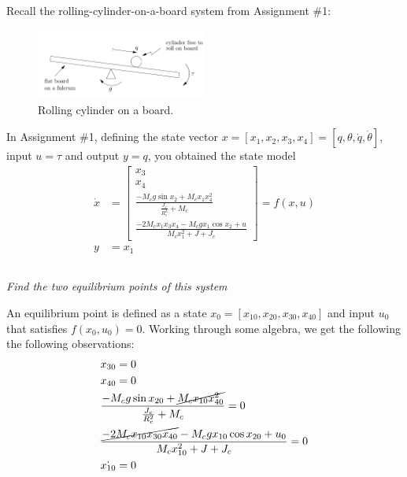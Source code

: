 \section{}
Recall the rolling-cylinder-on-a-board system from Assignment \#1:
\begin{figure}[h]
    \centering
    \includegraphics[width=0.5\textwidth]{Questions/Figures/Q2ProblemDiagram.png}
    \caption{Rolling cylinder on a board.}
    \label{fig:Q2 System}
\end{figure}


In Assignment \#1, defining the state vector $x = [x_1, x_2, x_3, x_4] = 
[q, \theta, \dot{q}, \dot{\theta}]$, input $u = \tau$ and output $y = q$, you obtained the state model
\[
    \begin{aligned}
        \dot{x} &=
        \begin{bmatrix}
            x_3 \\
            x_4 \\
            \frac{-M_c g \sin x_2 + M_c x_1 x_4^2}{\frac{J_c}{R_c^2} + M_c} \\
            \frac{- 2M_c x_1 x_3 x_4 - M_c g x_1 \cos x_2 + u}{M_c x_1^2 + J + J_c}
        \end{bmatrix} 
            = f(x, u) \\
        y &= x_1
    \end{aligned}
\]

\subsection{}
\textit{Find the two equilibrium points of this system}

An equilibrium point is defined as a state $x_0 = [x_{10}, x_{20}, x_{30}, x_{40}]$ and input $u_0$ that satisfies $f(x_0, u_0) = 0$. 
Working through some algebra, we get the following the following observations:
\[
    \begin{aligned}
        &x_{30} = 0 \\
        &x_{40} = 0 \\
        &\frac{-M_c g \sin x_{20} + \cancel{M_c x_{10} x_{40}^2}}{\frac{J_c}{R_c^2} + M_c} = 0 \\
        &\frac{\cancel{- 2M_c x_{10} x_{30} x_{40}} - M_c g x_{10} \cos x_{20} + u_0}{M_c x_{10}^2 + J + J_c} = 0 \\
        &\dot{x_{10}} = 0
    \end{aligned}
\]

